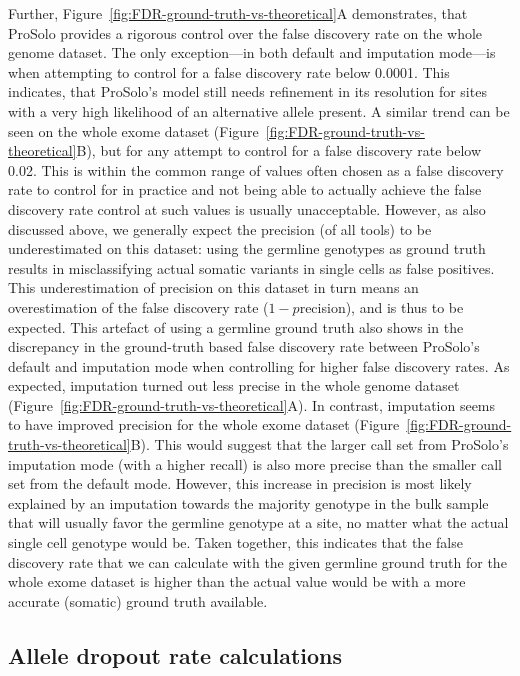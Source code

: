\documentclass[authoryear,preprint,11pt]{scrartcl}
\begin{document}
Further, Figure~\ref{fig:FDR-ground-truth-vs-theoretical}A demonstrates, that ProSolo provides a rigorous control over the false discovery rate on the whole genome dataset.
The only exception---in both default and imputation mode---is when attempting to control for a false discovery rate below 0.0001.
This indicates, that ProSolo's model still needs refinement in its resolution for sites with a very high likelihood of an alternative allele present.
A similar trend can be seen on the whole exome dataset (Figure~\ref{fig:FDR-ground-truth-vs-theoretical}B), but for any attempt to control for a false discovery rate below 0.02.
This is within the common range of values often chosen as a false discovery rate to control for in practice and not being able to actually achieve the false discovery rate control at such values is usually unacceptable.
However, as also discussed above, we generally expect the precision (of all tools) to be underestimated on this dataset: using the germline genotypes as ground truth results in misclassifying actual somatic variants in single cells as false positives.
This underestimation of precision on this dataset in turn means an overestimation of the false discovery rate ($1 - p$recision), and is thus to be expected.
This artefact of using a germline ground truth also shows in the discrepancy in the ground-truth based false discovery rate between ProSolo's default and imputation mode when controlling for higher false discovery rates.
As expected, imputation turned out less precise in the whole genome dataset (Figure~\ref{fig:FDR-ground-truth-vs-theoretical}A).
In contrast, imputation seems to have improved precision for the whole exome dataset (Figure~\ref{fig:FDR-ground-truth-vs-theoretical}B).
This would suggest that the larger call set from ProSolo's imputation mode (with a higher recall) is also more precise than the smaller call set from the default mode.
However, this increase in precision is most likely explained by an imputation towards the majority genotype in the bulk sample that will usually favor the germline genotype at a site, no matter what the actual single cell genotype would be.
Taken together, this indicates that the false discovery rate that we can calculate with the given germline ground truth for the whole exome dataset is higher than the actual value would be with a more accurate (somatic) ground truth available.


\subsection{Allele dropout rate calculations} \label{sec:suppl-adr-calc}
\end{document}
